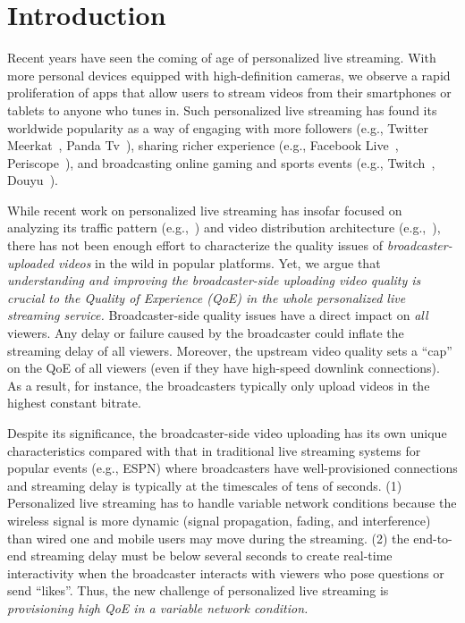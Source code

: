 \section{Introduction}
Recent years have seen the coming of age of personalized live
streaming. With more personal devices equipped with high-definition
cameras, we observe a rapid proliferation of apps that allow users
to stream videos from their smartphones or tablets to anyone who
tunes in. Such personalized live streaming has found its worldwide
popularity as a way of engaging with more followers (e.g., Twitter 
Meerkat~\cite{twitter}, Panda Tv~\cite{panda}),
sharing richer experience (e.g., Facebook Live~\cite{facebook}, Periscope~\cite{periscope}),
and broadcasting online gaming and sports events (e.g., Twitch~\cite{twitch}, Douyu~\cite{douyu}).


While recent work on personalized live streaming has insofar 
focused on analyzing its traffic pattern (e.g.,~\cite{zhang2015crowdsourced,tang2016meerkat})
and video distribution architecture (e.g.,~\cite{siekkinen2016first,wang2016anatomy}),
there has not been enough effort to characterize the 
quality issues of {\em broadcaster-uploaded videos} in the wild in popular platforms.
Yet, we argue that {\em understanding and improving the broadcaster-side uploading
video quality is crucial to the Quality of Experience (QoE) in the whole personalized live streaming service.}
Broadcaster-side quality issues
have a direct impact on {\em all} viewers.
Any delay or failure caused by the broadcaster could inflate the
streaming delay of all viewers. Moreover, the upstream video quality
sets a ``cap'' on the QoE of all
viewers (even if they have high-speed downlink connections).
As a result, for instance, the broadcasters typically only upload 
videos in the highest constant bitrate.

Despite its significance, the broadcaster-side video uploading has its own unique characteristics compared with that in traditional live streaming systems for popular events
(e.g., ESPN) where broadcasters have well-provisioned
connections and streaming delay is typically at the timescales 
of tens of seconds. (1) Personalized live streaming has to handle variable network conditions because the wireless signal is more dynamic  (signal propagation, fading, and interference) than wired one and mobile users may move during the streaming. (2) the end-to-end streaming delay must be below several seconds 
to create real-time interactivity when
the broadcaster interacts with viewers who pose questions
or send ``likes''.
Thus, the new challenge of personalized live streaming is {\em provisioning high QoE in a variable network condition.}


